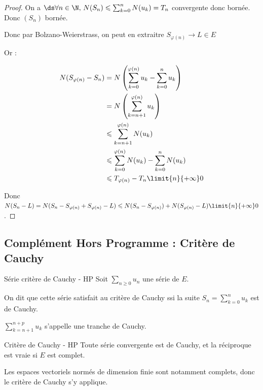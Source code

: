 \begin{proof}
    On a $\ds \forall n \in \N, \, N(S_n) \leqslant \sum_{k = 0}^n N(u_k) = T_n$ convergente donc bornée. 
    Donc $(S_n)$ bornée. 

    Donc par Bolzano-Weierstrass, on peut en extraitre $S_{\varphi(n)} \to L \in E$

    Or :

    \begin{align*}
        N(S_{\varphi(n)} - S_n) & = N\left(\sum_{k = 0}^{\varphi(n)} u_k - \sum_{k = 0}^n u_k\right) \\
                                & = N \left(\sum_{k = n + 1}^{\varphi(n)} u_k\right) \\
                                & \leqslant \sum_{k = n + 1}^{\varphi(n)} N(u_k) \\
                                & \leqslant \sum_{k = 0}^{\varphi(n)} N(u_k) - \sum_{k = 0}^n N(u_k) \\
                                & \leqslant T_{\varphi(n)} - T_n \limit{n}{+\infty} 0
    \end{align*}

    Donc $N(S_n - L) = N(S_n - S_{\varphi(n)} + S_{\varphi(n)} - L)
    \leqslant N(S_n - S_{\varphi(n)}) + N(S_{\varphi(n)} - L) \limit{n}{+ \infty} 0$.
\end{proof}

\subsection{Complément Hors Programme : Critère de Cauchy}

\begin{definition}{Série critère de Cauchy - HP}{}
    Soit $\sum_{n \geqslant 0} u_n$ une série de $E$.

    On dit que cette série satisfait au critère de Cauchy ssi la suite $\displaystyle S_n = \sum_{k = 0}^n u_k$ 
    est de Cauchy. 

    $\displaystyle \sum_{k = n + 1}^{n + p} u_k$ s'appelle une tranche de Cauchy. 
\end{definition}

\begin{theoreme}{Critère de Cauchy - HP}{}
    Toute série convergente est de Cauchy, et la réciproque est vraie si $E$ est complet.
\end{theoreme}

\begin{remarque}
    Les espaces vectoriels normés de dimension finie sont notamment complets, donc 
    le critère de Cauchy s'y applique.
\end{remarque}

